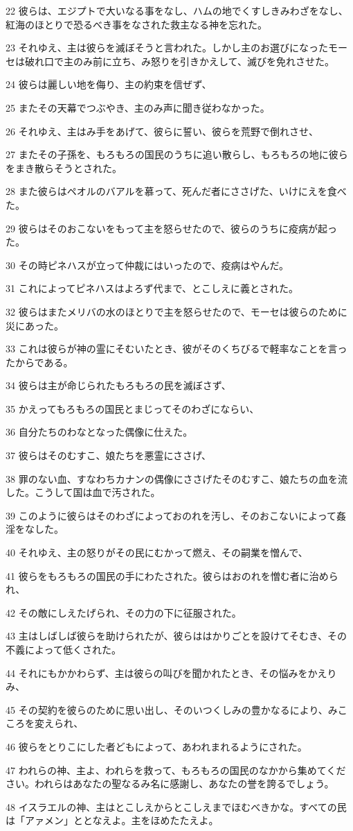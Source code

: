 \par 22 彼らは、エジプトで大いなる事をなし、ハムの地でくすしきみわざをなし、紅海のほとりで恐るべき事をなされた救主なる神を忘れた。
\par 23 それゆえ、主は彼らを滅ぼそうと言われた。しかし主のお選びになったモーセは破れ口で主のみ前に立ち、み怒りを引きかえして、滅びを免れさせた。
\par 24 彼らは麗しい地を侮り、主の約束を信ぜず、
\par 25 またその天幕でつぶやき、主のみ声に聞き従わなかった。
\par 26 それゆえ、主はみ手をあげて、彼らに誓い、彼らを荒野で倒れさせ、
\par 27 またその子孫を、もろもろの国民のうちに追い散らし、もろもろの地に彼らをまき散らそうとされた。
\par 28 また彼らはペオルのバアルを慕って、死んだ者にささげた、いけにえを食べた。
\par 29 彼らはそのおこないをもって主を怒らせたので、彼らのうちに疫病が起った。
\par 30 その時ピネハスが立って仲裁にはいったので、疫病はやんだ。
\par 31 これによってピネハスはよろず代まで、とこしえに義とされた。
\par 32 彼らはまたメリバの水のほとりで主を怒らせたので、モーセは彼らのために災にあった。
\par 33 これは彼らが神の霊にそむいたとき、彼がそのくちびるで軽率なことを言ったからである。
\par 34 彼らは主が命じられたもろもろの民を滅ぼさず、
\par 35 かえってもろもろの国民とまじってそのわざにならい、
\par 36 自分たちのわなとなった偶像に仕えた。
\par 37 彼らはそのむすこ、娘たちを悪霊にささげ、
\par 38 罪のない血、すなわちカナンの偶像にささげたそのむすこ、娘たちの血を流した。こうして国は血で汚された。
\par 39 このように彼らはそのわざによっておのれを汚し、そのおこないによって姦淫をなした。
\par 40 それゆえ、主の怒りがその民にむかって燃え、その嗣業を憎んで、
\par 41 彼らをもろもろの国民の手にわたされた。彼らはおのれを憎む者に治められ、
\par 42 その敵にしえたげられ、その力の下に征服された。
\par 43 主はしばしば彼らを助けられたが、彼らははかりごとを設けてそむき、その不義によって低くされた。
\par 44 それにもかかわらず、主は彼らの叫びを聞かれたとき、その悩みをかえりみ、
\par 45 その契約を彼らのために思い出し、そのいつくしみの豊かなるにより、みこころを変えられ、
\par 46 彼らをとりこにした者どもによって、あわれまれるようにされた。
\par 47 われらの神、主よ、われらを救って、もろもろの国民のなかから集めてください。われらはあなたの聖なるみ名に感謝し、あなたの誉を誇るでしょう。
\par 48 イスラエルの神、主はとこしえからとこしえまでほむべきかな。すべての民は「アァメン」ととなえよ。主をほめたたえよ。

